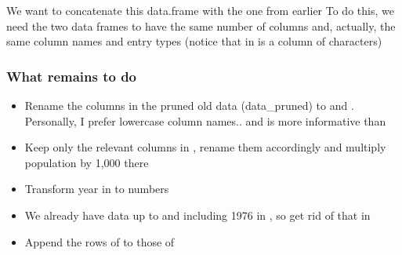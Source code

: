 \documentclass[aspectratio=169]{beamer}\usepackage[]{graphicx}\usepackage[]{xcolor}
\makeatletter
\newcommand{\hlnum}[1]{\textcolor[rgb]{0.686,0.059,0.569}{#1}}%
\newcommand{\hlstr}[1]{\textcolor[rgb]{0.192,0.494,0.8}{#1}}%
\newcommand{\hlopt}[1]{\textcolor[rgb]{0,0,0}{#1}}%
\newcommand{\hlstd}[1]{\textcolor[rgb]{0.345,0.345,0.345}{#1}}%
\newcommand{\hlkwb}[1]{\textcolor[rgb]{0.69,0.353,0.396}{#1}}%
\newcommand{\hlkwd}[1]{\textcolor[rgb]{0.737,0.353,0.396}{\textbf{#1}}}%
\newenvironment{kframe}{%
 \def\at@end@of@kframe{}%
 \ifinner\ifhmode%
  \def\at@end@of@kframe{\end{minipage}}%
  \begin{minipage}{\columnwidth}%
 \fi\fi%
 \def\FrameCommand##1{\hskip\@totalleftmargin \hskip-\fboxsep
 \colorbox{shadecolor}{##1}\hskip-\fboxsep
     \hskip-\linewidth \hskip-\@totalleftmargin \hskip\columnwidth}%
 \MakeFramed {\advance\hsize-\width
   \@totalleftmargin\z@ \linewidth\hsize
   \@setminipage}}%
 {\par\unskip\endMakeFramed%
 \at@end@of@kframe}
\newenvironment{knitrout}{}{} %
\makeatother
\begin{document}
\begin{frame}
We want to concatenate this data.frame with the one from earlier
\vfill
To do this, we need the two data frames to have the same number of columns and, actually, the same column names and entry types (notice that  in  is a column of characters)
\end{frame}

\begin{frame}\frametitle{What remains to do}
\begin{itemize}
\item Rename the columns in the pruned old data (data\_pruned) to  and . Personally, I prefer lowercase column names.. and  is more informative than 
\item Keep only the relevant columns in , rename them accordingly and multiply population by 1,000 there
\item Transform year in  to numbers
\item We already have data up to and including 1976 in , so get rid of that in 
\item Append the rows of  to those of 
\end{itemize}
\end{frame}


\end{document}
